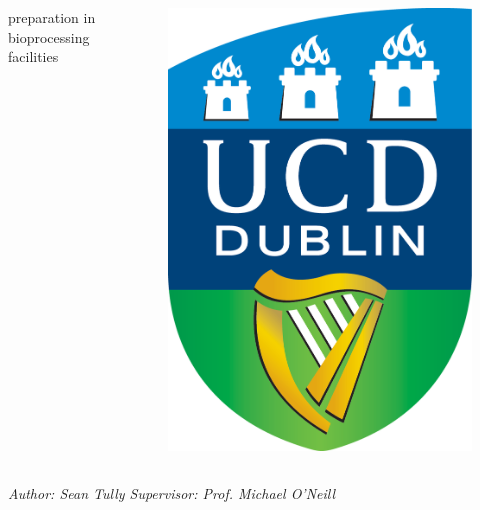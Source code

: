 \documentclass{beamer}
\begin{document}
\begin{frame}
\begin{columns}
{                       preparation in bioprocessing facilities}
            \begin{figure}
                \centering
                \includegraphics[angle=0,scale=0.03]{ucd_logo.png}
            \end{figure}
    \end{columns}
    \centering \small \emph{Author: Sean Tully \quad Supervisor: Prof. Michael
        O'Neill}\par
    \vspace{0.5cm}
    \begin{columns}

\end{columns}
\end{frame}
\end{document}
